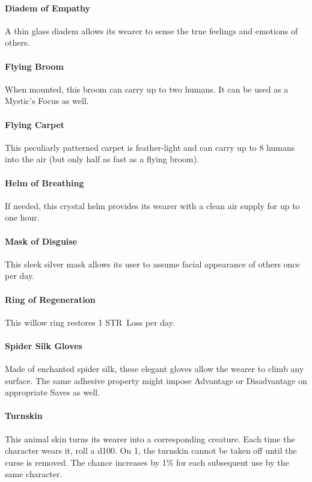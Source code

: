 \documentclass[itdr/core]{subfiles}
\begin{document}
\vfill
\paragraph{Diadem of Empathy}
A thin glass diadem allows its wearer to sense the true feelings and emotions of others.

\vfill
\paragraph{Flying Broom}
When mounted, this broom can carry up to two \mbox{humans}. It can be used as a Mystic's Focus as well.

\vfill
\paragraph{Flying Carpet}
This peculiarly patterned carpet is feather-light and can carry up to 8 humans into the air (but only half as fast as a flying broom).

\vfill
\paragraph{Helm of Breathing}
If needed, this crystal helm provides its wearer with a clean air supply for up to one hour.

\vfill
\paragraph{Mask of Disguise}
This sleek silver mask allows its user to assume \mbox{facial} appearance of others once per day.

\vfill
\paragraph{Ring of Regeneration}
This willow ring restores 1 STR~Loss per day.

\vfill
\paragraph{Spider Silk Gloves}
Made of enchanted spider silk, these elegant gloves allow the wearer to climb any surface. The same adhesive property might impose Advantage or Disadvantage on appropriate Saves as well.

\vfill
\paragraph{Turnskin}
This animal skin turns its wearer into a corresponding creature. Each time the character wears it, roll a d100. On 1, the turnskin cannot be taken off until the curse is removed. The chance increases by 1\% for each subsequent use by the same character.
\end{document}
